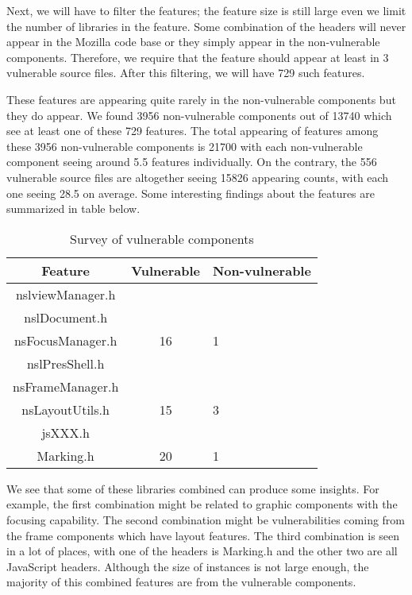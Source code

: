 \documentclass{acm_proc_article-sp}
\begin{document}
Next, we will have to filter the features; the feature size is still large even 
we limit the number of libraries in the feature. Some combination of the 
headers will never appear in the Mozilla code base or they simply appear in the 
non-vulnerable components. Therefore, we require that the feature should appear 
at least in 3%
vulnerable source files. After this filtering, we will have 729 such features.

These features are appearing quite rarely in the non-vulnerable components but 
they do appear. We found 3956 non-vulnerable components out of 13740 which see 
at least one of these 729 features. The total appearing of features among these 
3956 non-vulnerable components is 21700 with each non-vulnerable component 
seeing around 5.5 features individually. On the contrary, the 556 vulnerable 
source files are altogether seeing 15826 appearing counts, with each one seeing 
28.5 on average. Some interesting findings about the features are summarized in 
table below.

\begin{table}
\centering
\caption{Survey of vulnerable components}
\begin{tabular}{|c|c|l|} \hline
Feature&Vulnerable&Non-vulnerable\\ \hline
nslviewManager.h \\ nslDocument.h \\ nsFocusManager.h & 16 & 1 \\ \hline
nslPresShell.h \\ nsFrameManager.h \\ nsLayoutUtils.h & 15 & 3 \\ \hline
jsXXX.h \\ Marking.h & 20 & 1 \\ \hline
\end{tabular}
\end{table}

We see that some of these libraries combined can produce some insights. For 
example, the first combination might be related to graphic components with the 
focusing capability. The second combination might be vulnerabilities coming 
from the frame components which have layout features. The third combination is 
seen in a lot of places, with one of the headers is Marking.h and the other two 
are all JavaScript headers. Although the size of instances is not large enough, 
the majority of this combined features are from the vulnerable components.
\end{document}
